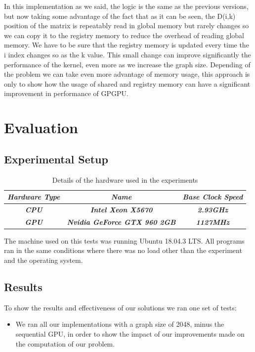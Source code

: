 \documentclass[conference]{IEEEtran}
\begin{document}
In this implementation as we said, the logic is the same as the previous versions, but now taking some advantage of the fact that as it can be seen, the D(i,k) position of the matrix is repeatably read in global memory but rarely changes so we can copy it to the registry memory to reduce the overhead of reading global memory. We have to be sure that the registry memory is updated every time the i index changes so as the k value. This small change can improve significantly the performance of the kernel, even more as we increase the graph size. Depending of the problem we can take even more advantage of memory usage, this approach is only to show how the usage of shared and registry memory can have a significant improvement in performance of GPGPU.

\section{Evaluation}

\subsection{Experimental Setup}

\begin{table}[htbp]
	\caption{Details of the hardware used in the experiments}
	\begin{center}
		\begin{tabular}{|c|c|c|}
		\hline
			\textbf{\textit{Hardware Type}} & \textbf{\textit{Name}} & \textbf{\textit{Base Clock Speed}}\\ \hline
			\textbf{\textit{CPU}} & \textbf{\textit{Intel Xeon X5670}} & \textbf{\textit{2.93GHz}} \\ \hline
			\textbf{\textit{GPU}} & \textbf{\textit{Nvidia GeForce GTX 960 2GB}} & \textbf{\textit{1127MHz}} \\ \hline
	\end{tabular}
	\label{tab1}
	\end{center}
\end{table}

The machine used on this tests was running Ubuntu 18.04.3 LTS. All programs ran in the same conditions where there was no load other than the experiment and the operating system.

\subsection{Results}

To show the results and effectiveness of our solutions we ran one set of tests:
\begin{itemize}
	\item We ran all our implementations with a graph size of 2048, minus the sequential GPU, in order to show the impact of our improvements made on the computation of our problem.
\end{itemize}
\end{document}
